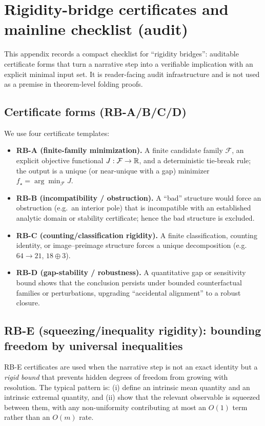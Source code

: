 \section{Rigidity-bridge certificates and mainline checklist (audit)}
\label{app:rigidity_bridge_checklist}

\AuditTag This appendix records a compact checklist for ``rigidity bridges'': auditable certificate forms that turn a narrative step into a verifiable implication with an explicit minimal input set.
It is reader-facing audit infrastructure and is not used as a premise in theorem-level folding proofs.

\subsection{Certificate forms (RB-A/B/C/D)}
\label{subsec:rb_certificate_forms}

We use four certificate templates:
\begin{itemize}
  \item \textbf{RB-A (finite-family minimization).}
  A finite candidate family $\mathcal{F}$, an explicit objective functional $J:\mathcal{F}\to\mathbb{R}$, and a deterministic tie-break rule; the output is a unique (or near-unique with a gap) minimizer $f_\star=\arg\min_{\mathcal{F}}J$.
  \item \textbf{RB-B (incompatibility / obstruction).}
  A ``bad'' structure would force an obstruction (e.g.\ an interior pole) that is incompatible with an established analytic domain or stability certificate; hence the bad structure is excluded.
  \item \textbf{RB-C (counting/classification rigidity).}
  A finite classification, counting identity, or image--preimage structure forces a unique decomposition (e.g.\ $64\to 21$, $18\oplus 3$).
  \item \textbf{RB-D (gap-stability / robustness).}
  A quantitative gap or sensitivity bound shows that the conclusion persists under bounded counterfactual families or perturbations, upgrading ``accidental alignment'' to a robust closure.
\end{itemize}

\subsection{RB-E (squeezing/inequality rigidity): bounding freedom by universal inequalities}
\label{subsec:rb_e_squeezing}
\AuditTag RB-E certificates are used when the narrative step is not an exact identity but a \emph{rigid bound} that prevents hidden degrees of freedom from growing with resolution.
The typical pattern is: (i) define an intrinsic mean quantity and an intrinsic extremal quantity, and (ii) show that the relevant observable is squeezed between them, with any non-uniformity contributing at most an $O(1)$ term rather than an $O(m)$ rate.

